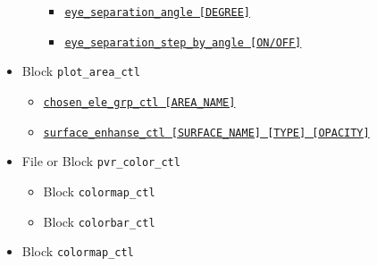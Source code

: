 \begin{itemize}
\begin{itemize}
\begin{itemize}
					\item \hyperref[href_t:eye_separation_angle]
							{\tt eye\_separation\_angle   [DEGREE]}
					\item \hyperref[href_t:eye_separation_step_by_angle]
							{\tt eye\_separation\_step\_by\_angle   [ON/OFF]}
				\end{itemize}
%
		\end{itemize}
%
	\item Block \verb|plot_area_ctl|
				\label{href_i:plot_area_ctl}
		\begin{itemize}
			\item \hyperref[href_t:chosen_ele_grp_ctl]
					{\tt chosen\_ele\_grp\_ctl    [AREA\_NAME]}
			\item \hyperref[href_t:surface_enhanse_ctl]
					{\tt surface\_enhanse\_ctl    [SURFACE\_NAME]  [TYPE]  [OPACITY]}
		\end{itemize}
%
	\item File or Block \verb|pvr_color_ctl|
			\label{href_i:pvr_color_ctl}
		\begin{itemize}
    			\item Block \verb|colormap_ctl|
 			\item Block \verb|colorbar_ctl|
		\end{itemize}
%
	\item Block \verb|colormap_ctl|
			\label{href_i:colormap_ctl}
\end{itemize}
